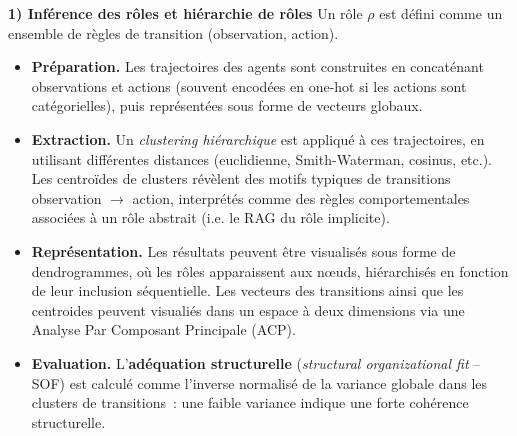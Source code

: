 \documentclass[francais,ROIA,Unicode,manuscript]{cedram}
\begin{document}


\noindent
\textbf{1) Inférence des rôles et hiérarchie de rôles} \quad
Un rôle \(\rho\) est défini comme un ensemble de règles de transition (observation, action).
\begin{itemize}
    \item \textbf{Préparation.} Les trajectoires des agents sont construites en concaténant observations et actions (souvent encodées en one-hot si les actions sont catégorielles), puis représentées sous forme de vecteurs globaux.
    \item \textbf{Extraction.} Un \textit{clustering hiérarchique} est appliqué à ces trajectoires, en utilisant différentes distances (euclidienne, Smith-Waterman, cosinus, etc.). Les centroïdes de clusters révèlent des motifs typiques de transitions observation $\rightarrow$ action, interprétés comme des règles comportementales associées à un rôle abstrait (i.e. le RAG du rôle implicite).
    \item \textbf{Représentation.} Les résultats peuvent être visualisés sous forme de dendrogrammes, où les rôles apparaissent aux nœuds, hiérarchisés en fonction de leur inclusion séquentielle. Les vecteurs des transitions ainsi que les centroides peuvent visualiés dans un espace à deux dimensions via une Analyse Par Composant Principale (ACP).
    \item \textbf{Evaluation.} L'\textbf{adéquation structurelle} (\textit{structural organizational fit} -- SOF) est calculé comme l’inverse normalisé de la variance globale dans les clusters de transitions~: une faible variance indique une forte cohérence structurelle.
\end{itemize}
\end{document}

